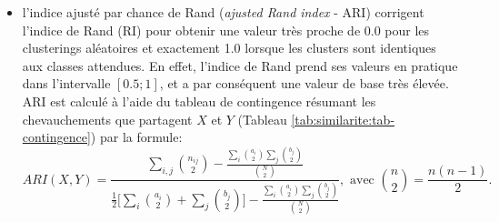 \begin{itemize}
	\item l'indice ajusté par chance de Rand (\textit{ajusted Rand index} - ARI) \citep{hubert1985adjustedrandidx} corrigent l'indice de Rand (RI) \citep{rand1971randidx} pour obtenir une valeur très proche de 0.0 pour les clusterings aléatoires et exactement 1.0 lorsque les clusters sont identiques aux classes attendues. En effet, l'indice de Rand prend ses valeurs en pratique dans l'intervalle $[0.5;1]$, et a par conséquent une valeur de base très élevée. ARI est calculé à l'aide du tableau de contingence résumant les chevauchements que partagent $X$ et $Y$ (Tableau \ref{tab:similarite:tab-contingence}) par la formule: %
	\[ARI(X,Y) = \frac{\sum\limits_{i,j}\binom{n_{ij}}{2} - \frac{\sum\limits_{i}\binom{a_{i}}{2}\sum\limits_{j}\binom{b_{j}}{2}}{\binom{N}{2}}}{\frac{1}{2}\big[\sum\limits_{i}\binom{a_{i}}{2}+\sum\limits_{j}\binom{b_{j}}{2}\big] - \frac{\sum\limits_{i}\binom{a_{i}}{2}\sum\limits_{j}\binom{b_{j}}{2}}{\binom{N}{2}}}, \text{ avec } \binom{n}{2} = \frac{n(n-1)}{2}.\]
	

\end{itemize}
